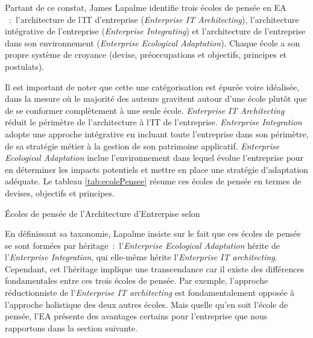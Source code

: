 Partant de ce constat, James Lapalme identifie trois écoles de pensée en EA 
\cite{lapalme2012three}~:~l'architecture de l'IT d'entreprise 
(\textit{Enterprise IT Architecting}), l'architecture intégrative de 
l'entreprise 
(\textit{Enterprise Integrating}) et l'architecture de l'entreprise dans son 
environnement (\textit{Enterprise Ecological Adaptation}). Chaque école a son 
propre système de croyance (devise, préoccupations et objectifs, principes et 
postulats).



Il est important de noter que cette une catégorisation est épurée voire
idéalisée, dans la mesure où le majorité des auteurs gravitent autour d'une
école plutôt que de se conformer complètement à une seule école.
\textit{Enterprise IT Architecting} réduit le périmètre de l'architecture à
l'IT de l'entreprise.  \textit{Enterprise Integration} adopte une approche
intégrative en incluant toute l'entreprise dans son périmètre, de sa stratégie
métier à la gestion de son patrimoine applicatif. \textit{Enterprise Ecological
Adaptation} inclue l'environnement dans lequel évolue l'entreprise pour en
déterminer les impacts potentiels et mettre en place une stratégie d'adaptation
adéquate. Le tableau \ref{tab:ecolePensee} résume ces écoles de pensée en
termes de devises, objectifs et principes. 

\begin{table}[!ht]
		
	\caption{Écoles de pensée de l'Architecture d'Entrerpise selon
\protect\cite{lapalme2012three}}
 	\label{tab:ecolePensee}
\end{table}

En définissant sa taxonomie, Lapalme insiste sur le fait que ces écoles de
pensée se sont formées par héritage~:~l'\textit{Enterprise Ecological
Adaptation} hérite de l'\textit{Enterprise Integration}, qui elle-même hérite
l'\textit{Enterprise IT architecting}. Cependant, cet l'héritage implique une
transcendance car il existe des différences fondamentales entre ces trois
écoles de pensée. Par exemple, l'approche réductionniste de
l'\textit{Enterprise IT architecting} est fondamentalement opposée à l'approche
holistique des deux autres écoles. Mais quelle qu'en soit l'école de pensée,
l'EA présente des avantages certains pour l'entreprise que nous rapportons dans
la section suivante. 


